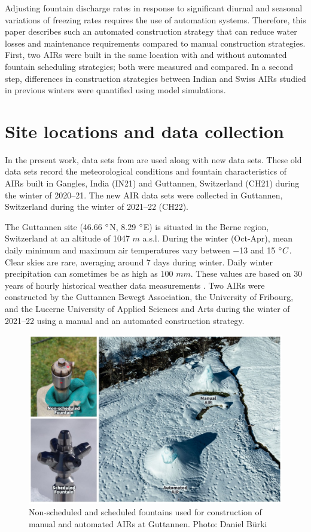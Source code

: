\documentclass[tc, manuscript]{copernicus}
\begin{document}
Adjusting fountain discharge rates in response to significant diurnal and seasonal variations of freezing rates
requires the use of automation systems. Therefore, this paper describes such an automated construction strategy
that can reduce water losses and maintenance requirements compared to manual construction strategies. First, two
AIRs were built in the same location with and without automated fountain scheduling strategies; both were
measured and compared. In a second step, differences in construction strategies between Indian and Swiss AIRs
studied in previous winters were quantified using model simulations. 

\section{Site locations and data collection}

In the present work, data sets from \citet{balasubramanianInfluenceMeteorologicalConditions2022} are used along
with new data sets. These old data sets record the meteorological conditions and fountain characteristics of
AIRs built in Gangles, India (IN21) and Guttannen, Switzerland (CH21) during the winter of 2020--21. The new AIR
data sets were collected in Guttannen, Switzerland during the winter of 2021--22 (CH22).

The Guttannen site (46.66 $^{\circ}$N, 8.29 $^{\circ}$E) is situated in the Berne region, Switzerland at an
altitude of 1047 $m$ a.s.l. During the winter (Oct-Apr), mean daily minimum and maximum air temperatures vary
between $-$13 and 15 $^{\circ} C$. Clear skies are rare, averaging around 7 days during winter. Daily winter
precipitation can sometimes be as high as 100 $mm$. These values are based on 30 years of hourly historical
weather data measurements \citep{meteoblueClimateGuttannen2021}. Two AIRs were constructed by the Guttannen
Bewegt Association, the University of Fribourg, and the Lucerne University of Applied Sciences and Arts during
the winter of 2021--22 using a manual and an automated construction strategy.

\begin{figure}[htb]
\includegraphics[width=12cm]{Figures/AIR_fountains.jpg}
\caption{Non-scheduled and scheduled fountains used for construction of manual and automated AIRs at
  Guttannen. Photo: Daniel Bürki}
\label{fig:2AIR}
\end{figure}
\end{document}
